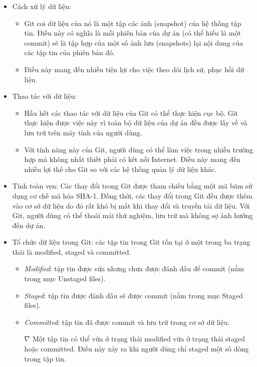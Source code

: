 \documentclass[12pt,a4paper]{report}
\begin{document}
\begin{itemize}
\item Cách xử lý dữ liệu:
	\begin{itemize}
		\item Git coi dữ liệu của nó là một tập các ảnh (snapshot) của hệ thống tập tin. Điều này có nghĩa là mỗi phiên bản của dự án (có thể hiểu là một commit) sẽ là tập hợp của một số ảnh lưu (snapshots) lại nội dung của các tập tin của phiên bản đó.
		\item Điều này mang đến nhiều tiện lợi cho việc theo dõi lịch sử, phục hồi dữ liệu.
	\end{itemize}
\item Thao tác với dữ liệu:
	\begin{itemize}
		\item Hầu hết các thao tác với dữ liệu của Git có thể thực hiện cục bộ. Git thực hiện được việc này vì toàn bộ dữ liệu của dự án đều được lấy về và lưu trữ trên máy tính của người dùng.
		\item Với tính năng này của Git, người dùng có thể làm việc trong nhiều trường hợp mà không nhất thiết phải có kết nối Internet. Điều này mang đến nhiều lợi thế cho Git so với các hệ thống quản lý dữ liệu khác.
		\end{itemize}
\item Tính toàn vẹn: Các thay đổi trong Git được tham chiếu bằng một mã băm sử dụng cơ chế mã hóa SHA-1. Đồng thời, các thay đổi trong Git đều được thêm vào cơ sở dữ liệu do đó rất khó bị mất khi thay đổi và truyền tải dữ liệu. Với Git, người dùng có thể thoải mái thử nghiệm, lưu trữ mà không sợ ảnh hưởng đến dự án.
\item Tổ chức dữ liệu trong Git: các tập tin trong Git tồn tại ở một trong ba trạng thái là modified, staged và committed.
	\begin{itemize}
		\item {\it Modified}: tập tin được sửa nhưng chưa được đánh dấu để commit (nằm trong mục Unstaged files).
		\item {\it	Staged}: tập tin được đánh dấu sẽ được commit (nằm trong mục Staged files).
		\item {\it Committed}: tập tin đã được commit và lưu trữ trong cơ sở dữ liệu.
		\item[$\nabla$] Một tập tin có thể vừa ở trạng thái modified vừa ở trạng thái staged hoặc committed. Điều này xảy ra khi người dùng chỉ staged một số dòng trong tập tin.
	\end{itemize}

\end{itemize}
\end{document}
